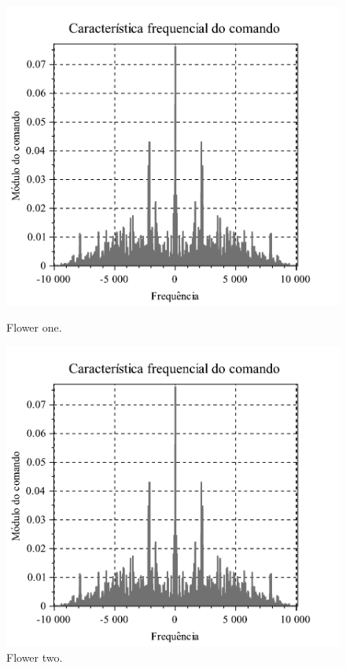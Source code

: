 \documentclass{article}
\begin{document}
\begin{figure}[!h]
  \centering
  \begin{minipage}[b]{0.4\textwidth}
    \includegraphics[width=\textwidth]{Figuras/Freq_Com.pdf}
    \caption{Flower one.}
  \end{minipage}
  \hfill
  \begin{minipage}[b]{0.4\textwidth}
    \includegraphics[width=\textwidth]{Figuras/Freq_Com.pdf}
    \caption{Flower two.}
  \end{minipage}
\end{figure}
\end{document}
